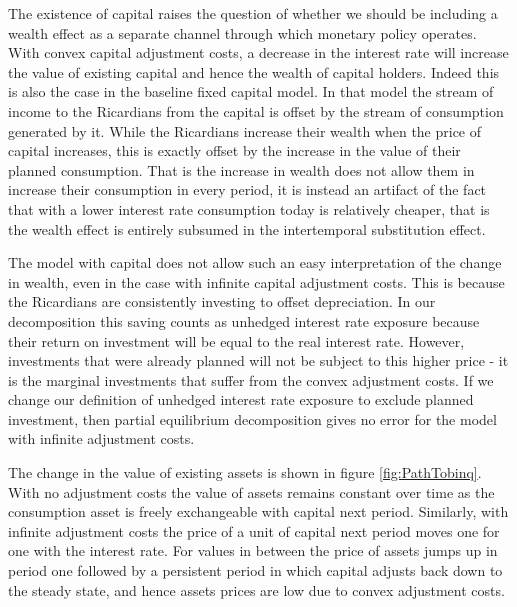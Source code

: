 \documentclass[12pt,a4paper]{article}
\begin{document}
The existence of capital raises the question of whether we should be including a wealth effect as a separate channel through which monetary policy operates. With convex capital adjustment costs, a decrease in the interest rate will increase the value of existing capital and hence the wealth of capital holders. Indeed this is also the case in the baseline fixed capital model. In that model the stream of income to the Ricardians from the capital is  offset by the stream of consumption generated by it. While the Ricardians increase their wealth when the price of capital increases, this is exactly offset by the increase in the value of their planned consumption. That is the increase in wealth does not allow them in increase their consumption in every period, it is instead an artifact of the fact that with a lower interest rate consumption today is relatively cheaper, that is the wealth effect is entirely subsumed in the intertemporal substitution effect.

The model with capital does not allow such an easy interpretation of the change in wealth, even in the case with infinite capital adjustment costs. This is because the Ricardians are consistently investing to offset depreciation. In our decomposition this saving counts as unhedged interest rate exposure because their return on investment will be equal to the real interest rate. However, investments that were already planned will not be subject to this higher price - it is the marginal investments that suffer from the convex adjustment costs. If we change our definition of unhedged interest rate exposure to exclude planned investment, then partial equilibrium decomposition gives no error for the model with infinite adjustment costs.



The change in the value of existing assets is shown in figure \ref{fig:PathTobinq}. With no adjustment costs the value of assets remains constant over time as the consumption asset is freely exchangeable with capital next period. Similarly, with infinite adjustment costs the price of a unit of capital next period moves one for one with the interest rate. For values in between the price of assets jumps up in period one followed by a persistent period in which capital adjusts back down to the steady state, and hence assets prices are low due to convex adjustment costs.
\end{document}
